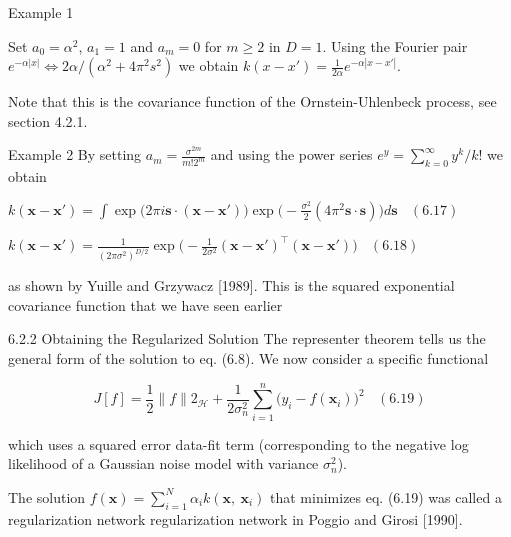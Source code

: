 \documentclass[
  ignorenonframetext,
]{beamer}
\begin{document}
\begin{frame}{}
\protect\hypertarget{section-10}{}
\begin{exampleblock}{Example 1}

Set $a_0 = \alpha^2$, $a_1 = 1$ and $a_m = 0$ for $m \geq  2$ in $D = 1$. 
Using the Fourier pair $e^{−\alpha |x|} \Leftrightarrow 2\alpha /(\alpha^2 + 4\pi ^2 s^2)$ we obtain $k(x − x') = \frac 1 {2\alpha} e^{−\alpha |x− x'|}$.

Note that this is the covariance function of the Ornstein-Uhlenbeck process, see section 4.2.1.
\end{exampleblock}

\begin{exampleblock}{Example 2} 
By setting $a_m = \frac {\sigma^{2m}} {m!2^m}$ and using the power series $e^y = \sum^\infty_{k=0} y^k/k!$ we obtain

$k(\pmb x −  \pmb x') = \int \exp\big(2\pi i \pmb s \cdot (\pmb x −  \pmb x')\big) \exp \Big(−{\frac {\sigma^2} 2} (4\pi^2 \pmb s \cdot \pmb s) \Big) d \pmb s \ \ \ \ (6.17)$

$k(\pmb x −  \pmb x') = {\frac 1 {(2\pi \sigma^2)^{D/2}}} \exp\Big(− \frac 1 {2\sigma^2} (\pmb x −  \pmb x')^{\top} (\pmb x −  \pmb x')\Big) \ \ \ \ (6.18)$

as shown by Yuille and Grzywacz [1989]. This is the squared exponential covariance function that we have seen earlier
\end{exampleblock}
\end{frame}

\begin{frame}{6.2.2 Obtaining the Regularized Solution}
\protect\hypertarget{obtaining-the-regularized-solution}{}
The representer theorem tells us the general form of the solution to eq.
(6.8). We now consider a specific functional

\[
J[f] = \frac 1 2 \|f\|2_{\mathcal H} + \frac 1 {2\sigma_n^2}\sum_{i=1}^n \big(y_i − f(\pmb x_i)\big)^2 \ \ \ \ (6.19)
\]

which uses a squared error data-fit term (corresponding to the negative
log likelihood of a Gaussian noise model with variance \(\sigma^2_n\)).

The solution \(f(\pmb x) = \sum^N_{i=1}\alpha_ik(\pmb x,\ \pmb x_i)\)
that minimizes eq. (6.19) was called a regularization network
regularization network in Poggio and Girosi {[}1990{]}.
\end{frame}
\end{document}

